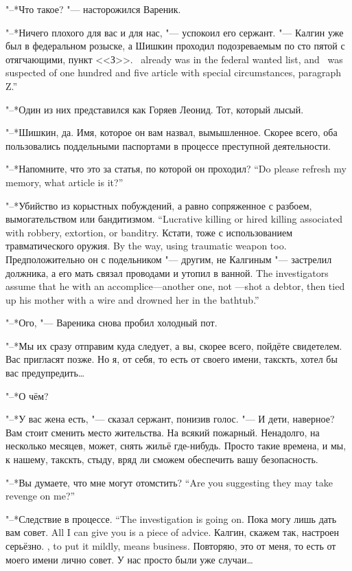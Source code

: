 "--*Что такое? "--- насторожился Вареник.

"--*Ничего плохого для вас и для нас, "--- успокоил его сержант.
{"--- Калгин уже был в федеральном розыске, а Шишкин проходил подозреваемым по сто пятой с отягчающими, пункт <<З>>.}
{\Kalgin\ already was in the federal wanted list, and \Shishkin\ was suspected of one hundred and five article with special circumstances, paragraph Z.''}

"--*Один из них представился как Горяев Леонид.
Тот, который лысый.

"--*Шишкин, да.
Имя, которое он вам назвал, вымышленное.
Скорее всего, оба пользовались поддельными паспортами в процессе преступной деятельности.

{"--*Напомните, что это за статья, по которой он проходил?}
{``Do please refresh my memory, what article is it?''}

{"--*Убийство из корыстных побуждений, а равно сопряженное с разбоем, вымогательством или бандитизмом.}
{``Lucrative killing or hired killing associated with robbery, extortion, or banditry.}
{Кстати, тоже с использованием травматического оружия.}
{By the way, using traumatic weapon too.}
{Предположительно он с подельником "--- другим, не Калгиным "--- застрелил должника, а его мать связал проводами и утопил в ванной.}
{The investigators assume that he with an accomplice---another one, not \Kalgin---shot a debtor, then tied up his mother with a wire and drowned her in the bathtub.''}

"--*Ого, "--- Вареника снова пробил холодный пот.

"--*Мы их сразу отправим куда следует, а вы, скорее всего, пойдёте свидетелем.
Вас пригласят позже.
Но я, от себя, то есть от своего имени, такскть, хотел бы вас предупредить\ldots{}

"--*О чём?

"--*У вас жена есть, "--- сказал сержант, понизив голос.
"--- И дети, наверное?
Вам стоит сменить место жительства.
На всякий пожарный.
Ненадолго, на несколько месяцев, может, снять жильё где-нибудь.
Просто такие времена, и мы, к нашему, такскть, стыду, вряд ли сможем обеспечить вашу безопасность.

{"--*Вы думаете, что мне могут отомстить?}
{``Are you suggesting they may take revenge on me?''}

{"--*Следствие в процессе.}
{``The investigation is going on.}
{Пока могу лишь дать вам совет.}
{All I can give you is a piece of advice.}
{Калгин, скажем так, настроен серьёзно.}
{\Kalgin, to put it mildly, means business.}
Повторяю, это от меня, то есть от моего имени лично совет.
У нас просто были уже случаи\ldots{}

